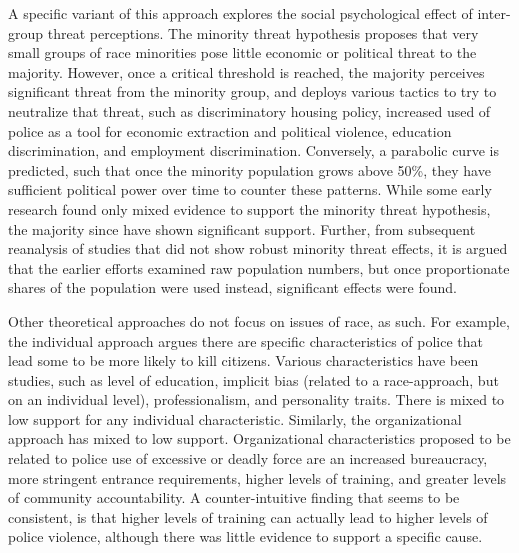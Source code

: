 \documentclass[sigconf]{acmart}
\begin{document}
A specific variant of this approach explores the social psychological effect of inter-group threat perceptions.  The minority threat hypothesis proposes that very small groups of race minorities pose little economic or political threat to the majority.  However, once a critical threshold is reached, the majority perceives significant threat from the minority group, and deploys various tactics to try to neutralize that threat, such as discriminatory housing policy, increased used of police as a tool for economic extraction and political violence, education discrimination, and employment discrimination. \cite{luders10} Conversely, a parabolic curve is predicted, such that once the minority population grows above 50\%, they have sufficient political power over time to counter these patterns. While some early research found only mixed evidence to support the minority threat hypothesis, the majority since have shown significant support. \cite{legewie15,smith04,smith14,holmes00,stults07,jacobs02,kent05,petro03}  Further, from subsequent reanalysis of studies that did not show robust minority threat effects, it is argued that the earlier efforts examined raw population numbers, but once proportionate shares of the population were used instead, significant effects were found. \cite{legewie15}

Other theoretical approaches do not focus on issues of race, as such.  For example, the individual approach argues there are specific characteristics of police that lead some to be more likely to kill citizens.  Various characteristics have been studies, such as level of education, implicit bias (related to a race-approach, but on an individual level), professionalism, and personality traits. \cite{nix17,smith04}  There is mixed to low support for any individual characteristic.  Similarly, the organizational approach has mixed to low support.  Organizational characteristics proposed to be related to police use of excessive or deadly force are an increased bureaucracy, more stringent entrance requirements, higher levels of training, and greater levels of community accountability. \cite{nix17,smith04,smith14} A counter-intuitive finding that seems to be consistent, is that higher levels of training can actually lead to higher levels of police violence, although there was little evidence to support a specific cause.
\end{document}
